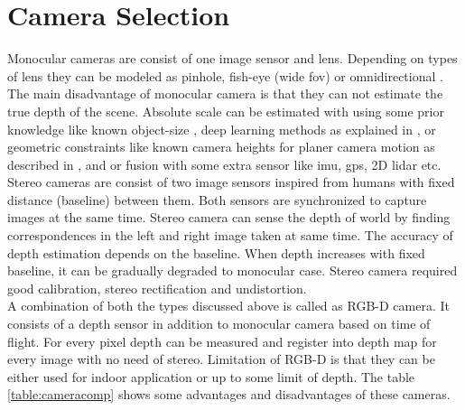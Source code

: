\section{Camera Selection}
Monocular cameras are consist of one image sensor and lens. Depending on types of lens they can be modeled as pinhole, fish-eye (wide \acrshort{fov}) or omnidirectional \cite{multiview_geometry}. The main disadvantage of monocular camera is that they can not estimate the true depth of the scene. Absolute scale can be estimated with using some prior knowledge like known object-size \cite{citymodel}, deep learning methods as explained in \cite{synthetic}, \cite{deepl} or geometric constraints like known camera heights for planer camera motion as described in \cite{ground}, \cite{geometric} and \cite{planer} or fusion with some extra sensor like \acrshort{imu}, \acrshort{gps}, 2D \acrshort{lidar} etc. \\
\newline
Stereo cameras are consist of two image sensors inspired from humans with fixed distance (baseline) between them. Both sensors are synchronized to capture images at the same time. Stereo camera can sense the depth of world by finding correspondences in the left and right image taken at same time. The accuracy of depth estimation depends on the baseline. When depth increases with fixed baseline, it can be gradually degraded to monocular case. Stereo camera required good calibration, stereo rectification and undistortion. \\
\newline
A combination of both the types discussed above is called as RGB-D camera. It consists of a depth sensor in addition to monocular camera based on time of flight. For every pixel depth can be measured and register into depth map for every image with no need of stereo. Limitation of RGB-D is that they can be either used for indoor application or up to some limit of depth. The table \ref{table:cameracomp} shows some advantages and disadvantages of these cameras.\\
